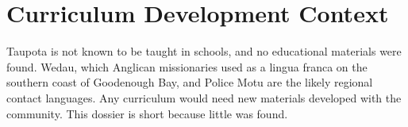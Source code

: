 \documentclass[12pt]{article}
\begin{document}
\section{Curriculum Development Context}
Taupota is not known to be taught in schools, and no educational materials were found. Wedau, which Anglican missionaries used as a lingua franca on the southern coast of Goodenough Bay, and Police Motu are the likely regional contact languages. Any curriculum would need new materials developed with the community. This dossier is short because little was found.
\end{document}
